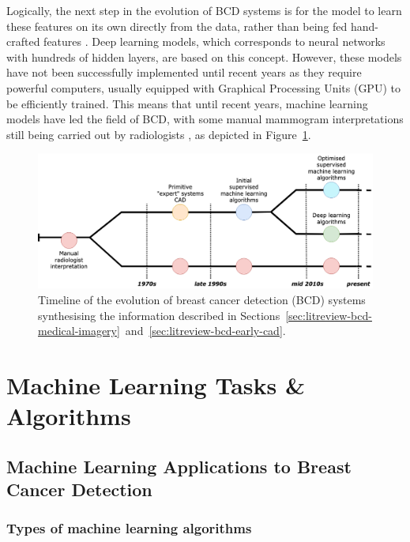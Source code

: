 Logically, the next step in the evolution of BCD systems is for the model to learn these features on its own directly from the data, rather than being fed hand-crafted features \citep{Yala2019}. Deep learning models, which corresponds to neural networks with hundreds of hidden layers, are based on this concept. However, these models have not been successfully implemented until recent years as they require powerful computers, usually equipped with Graphical Processing Units (GPU) to be efficiently trained. This means that until recent years, machine learning models have led the field of BCD, with some manual mammogram interpretations still being carried out by radiologists \citep{Litjens2017}, as depicted in Figure~\ref{fig:litsurvey-bcd-timeline}.

\begin{figure}[ht]
\centerline{\includegraphics[width=\textwidth]{figures/litsurvey/bcd_timeline.png}}
\caption{\label{fig:litsurvey-bcd-timeline}Timeline of the evolution of breast cancer detection (BCD) systems synthesising the information described in Sections~\ref{sec:litreview-bcd-medical-imagery}~and~\ref{sec:litreview-bcd-early-cad}.}
\end{figure}


\section{Machine Learning Tasks \& Algorithms}
\label{sec:litreview-MLmodel-BCDapplications}

\subsection{Machine Learning Applications to Breast Cancer Detection}

\subsubsection{Types of machine learning algorithms}

